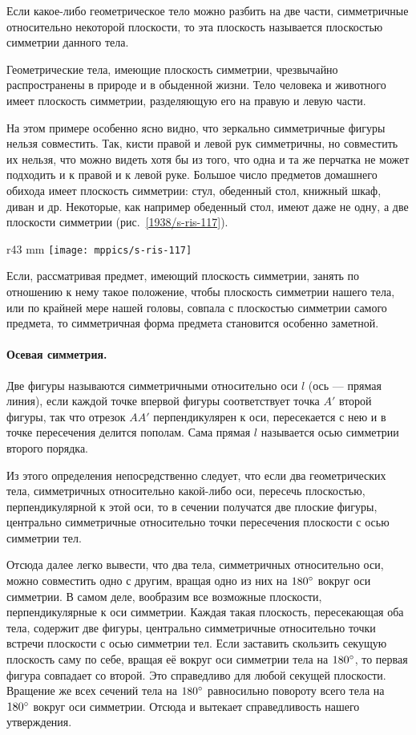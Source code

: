 Если какое-либо геометрическое тело можно разбить на две части, симметричные относительно некоторой плоскости, то эта плоскость называется плоскостью симметрии данного тела.

Геометрические тела, имеющие плоскость симметрии, чрезвычайно распространены в природе и в обыденной жизни.
Тело человека и животного имеет плоскость симметрии, разделяющую его на правую и левую части.

На этом примере особенно ясно видно, что зеркально симметричные фигуры нельзя совместить.
Так, кисти правой и левой рук симметричны, но совместить их нельзя, что можно видеть хотя бы из того, что одна и та же перчатка не может подходить и к правой и к левой руке.
Большое число предметов домашнего обихода имеет плоскость симметрии: стул, обеденный стол, книжный шкаф, диван и др.
Некоторые, как например обеденный стол, имеют даже не одну, а две плоскости симметрии (рис.~\ref{1938/s-ris-117}).

{

\begin{wrapfigure}{r}{43 mm}
\vskip-7mm
\centering
\texttt{[image: mppics/s-ris-117]}
\caption{}\label{1938/s-ris-117}
\vskip-0mm
\end{wrapfigure}

Если, рассматривая предмет, имеющий плоскость симметрии, занять по отношению к нему такое положение, чтобы плоскость симметрии нашего тела, или по крайней мере нашей головы, совпала с плоскостью симметрии самого предмета, то симметричная форма предмета становится особенно заметной.

}

\paragraph{Осевая симметрия.}\label{1938/s101}
Две фигуры называются симметричными относительно оси $l$ (ось — прямая линия), если каждой точке впервой фигуры соответствует точка $A'$ второй фигуры, так что отрезок $AA'$ перпендикулярен к оси, пересекается с нею и в точке пересечения делится пополам.
Сама прямая $l$ называется осью симметрии второго порядка.

Из этого определения непосредственно следует, что если два геометрических тела, симметричных относительно какой-либо оси, пересечь плоскостью, перпендикулярной к этой оси, то в сечении получатся две плоские фигуры, центрально симметричные относительно точки пересечения плоскости с осью симметрии тел.

Отсюда далее легко вывести, что два тела, симметричных относительно оси, можно совместить одно с другим, вращая одно из них на $180\degree$ вокруг оси симметрии.
В самом деле, вообразим все возможные плоскости, перпендикулярные к оси симметрии.
Каждая такая плоскость, пересекающая оба тела, содержит две фигуры, центрально симметричные относительно точки встречи плоскости с осью симметрии тел.
Если заставить скользить секущую плоскость саму по себе, вращая её вокруг оси симметрии тела на $180\degree$, то первая фигура совпадает со второй.
Это справедливо для любой секущей плоскости.
Вращение же всех сечений тела на $180\degree$ равносильно повороту всего тела на $180\degree$ вокруг оси симметрии.
Отсюда и вытекает справедливость нашего утверждения.

